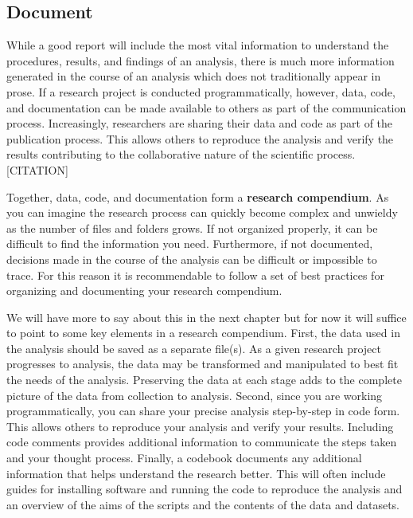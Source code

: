 \documentclass[
  letterpaper,
  DIV=11,
  numbers=noendperiod]{scrreport}
\theoremstyle{definition}
\theoremstyle{remark}
\begin{document}
\hypertarget{sec-aa-document}{%
\subsection{Document}\label{sec-aa-document}}

While a good report will include the most vital information to
understand the procedures, results, and findings of an analysis, there
is much more information generated in the course of an analysis which
does not traditionally appear in prose. If a research project is
conducted programmatically, however, data, code, and documentation can
be made available to others as part of the communication process.
Increasingly, researchers are sharing their data and code as part of the
publication process. This allows others to reproduce the analysis and
verify the results contributing to the collaborative nature of the
scientific process.  {[}CITATION{]}

Together, data, code, and documentation form a \textbf{research
compendium}. As you can imagine the research process can quickly become
complex and unwieldy as the number of files and folders grows. If not
organized properly, it can be difficult to find the information you
need. Furthermore, if not documented, decisions made in the course of
the analysis can be difficult or impossible to trace. For this reason it
is recommendable to follow a set of best practices for organizing and
documenting your research compendium.

We will have more to say about this in the next chapter but for now it
will suffice to point to some key elements in a research compendium.
First, the data used in the analysis should be saved as a separate
file(s). As a given research project progresses to analysis, the data
may be transformed and manipulated to best fit the needs of the
analysis. Preserving the data at each stage adds to the complete picture
of the data from collection to analysis. Second, since you are working
programmatically, you can share your precise analysis step-by-step in
code form. This allows others to reproduce your analysis and verify your
results. Including code comments provides additional information to
communicate the steps taken and your thought process. Finally, a
codebook documents any additional information that helps understand the
research better. This will often include guides for installing software
and running the code to reproduce the analysis and an overview of the
aims of the scripts and the contents of the data and datasets.
\end{document}

